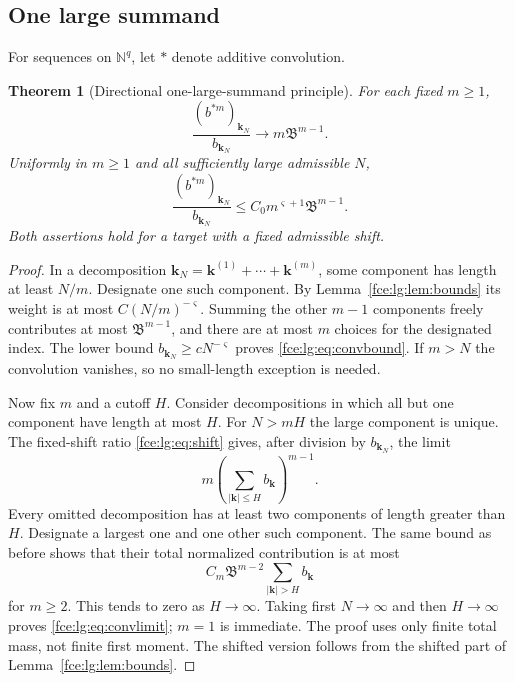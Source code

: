 \documentclass[11pt,a4paper]{article}
\numberwithin{equation}{section}
\newtheorem{theorem}{Theorem}[section]
\theoremstyle{definition}\newtheorem{definition}[theorem]{Definition}
\theoremstyle{remark}\newtheorem{remark}[theorem]{Remark}
\newcommand{\N}{\mathbb N}
\newcommand{\Bmass}{\mathfrak B}
\begin{document}
\subsection{One large summand}
For sequences on $\N^q$, let $*$ denote additive convolution.
\begin{theorem}[Directional one-large-summand principle]\label{fce:lg:thm:convolution}
For each fixed $m\ge1$,
\begin{equation}\label{fce:lg:eq:convlimit}
 \frac{(b^{*m})_{\boldsymbol k_N}}{b_{\boldsymbol k_N}}\longrightarrow m\Bmass^{m-1}.
\end{equation}
Uniformly in $m\ge1$ and all sufficiently large admissible $N$,
\begin{equation}\label{fce:lg:eq:convbound}
 \frac{(b^{*m})_{\boldsymbol k_N}}{b_{\boldsymbol k_N}}
 \le C_0m^{\varsigma+1}\Bmass^{m-1}.
\end{equation}
Both assertions hold for a target with a fixed admissible shift.
\end{theorem}
\begin{proof}
In a decomposition
$\boldsymbol k_N=\boldsymbol k^{(1)}+\cdots+\boldsymbol k^{(m)}$, some
component has length at least $N/m$. Designate one such component. By
Lemma~\ref{fce:lg:lem:bounds} its weight is at most $C(N/m)^{-\varsigma}$.
Summing the other $m-1$ components freely contributes at most
$\Bmass^{m-1}$, and there are at most $m$ choices for the designated index.
The lower bound $b_{\boldsymbol k_N}\ge cN^{-\varsigma}$ proves
\eqref{fce:lg:eq:convbound}. If $m>N$ the convolution vanishes, so no
small-length exception is needed.

Now fix $m$ and a cutoff $H$. Consider decompositions in which all but one
component have length at most $H$. For $N>mH$ the large component is
unique. The fixed-shift ratio \eqref{fce:lg:eq:shift} gives, after division
by $b_{\boldsymbol k_N}$, the limit
\[
 m\left(\sum_{|\boldsymbol k|\le H}b_{\boldsymbol k}\right)^{m-1}.
\]
Every omitted decomposition has at least two components of length greater
than $H$. Designate a largest one and one other such component. The same
bound as before shows that their total normalized contribution is at most
\[
 C_m \Bmass^{m-2}\sum_{|\boldsymbol k|>H}b_{\boldsymbol k}
\]
for $m\ge2$. This tends to zero as $H\to\infty$. Taking first
$N\to\infty$ and then $H\to\infty$ proves \eqref{fce:lg:eq:convlimit};
$m=1$ is immediate. The proof uses only finite total mass, not finite first
moment. The shifted version follows from the shifted part of
Lemma~\ref{fce:lg:lem:bounds}.
\end{proof}
\end{document}
